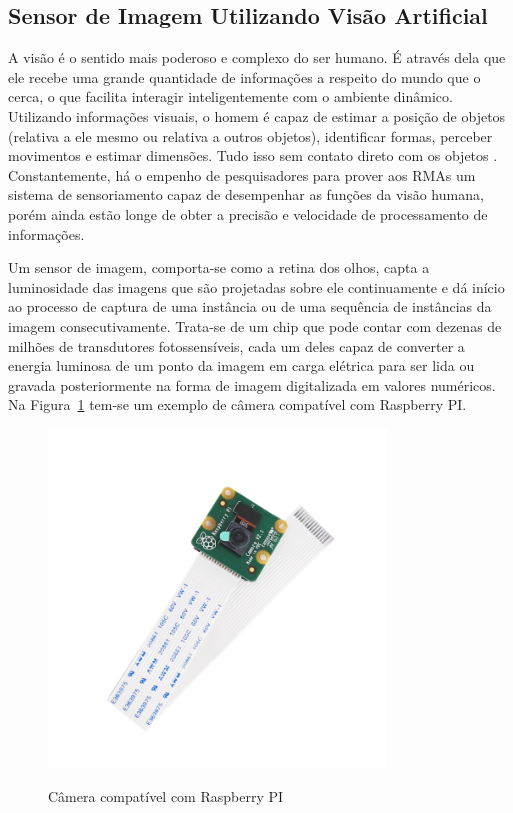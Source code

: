 \subsection{Sensor de Imagem Utilizando Visão Artificial}
\label{subsec:sensores-imagensVisão}

A visão é o sentido mais poderoso e complexo do ser humano. É através dela que ele recebe uma grande quantidade de informações a respeito do mundo que o cerca, o que facilita interagir inteligentemente com o ambiente dinâmico. Utilizando informações visuais, o homem é capaz de estimar a posição de objetos (relativa a ele mesmo ou relativa a outros objetos), identificar formas, perceber movimentos e estimar dimensões. Tudo isso sem contato direto com os objetos \cite{rogeralex1999}.
Constantemente, há o empenho de pesquisadores para prover aos RMAs um sistema de sensoriamento capaz de desempenhar as funções da visão humana, porém ainda estão longe de obter a precisão e velocidade de processamento de informações.

Um sensor de imagem, comporta-se como a retina dos olhos, capta a luminosidade das imagens que são projetadas sobre ele continuamente e dá início ao processo de captura de uma instância ou de uma sequência de instâncias da imagem consecutivamente. Trata-se de um chip que pode contar com dezenas de milhões de transdutores fotossensíveis, cada um deles capaz de converter a energia luminosa de um ponto da imagem em carga elétrica para ser lida ou gravada posteriormente na forma de imagem digitalizada em valores numéricos. Na Figura~\ref{fig:sensor-camRaspberry} tem-se um exemplo de câmera compatível com Raspberry PI. 

\begin{figure}[!hbtp]
  \centering
   \caption{Câmera compatível com Raspberry PI}
    \includegraphics[width = 0.8\textwidth]{Caps/Figs/mat-met/CamRaspberry.jpg}
   \label{fig:sensor-camRaspberry}
\end{figure}

